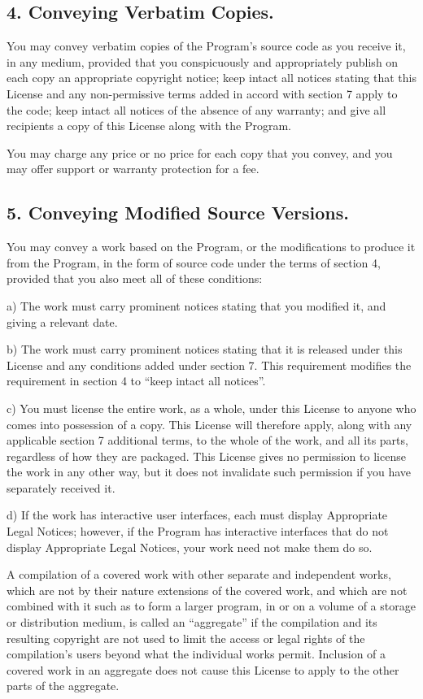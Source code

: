 \subsection{4. Conveying Verbatim Copies.}
You may convey verbatim copies of the Program's source code as you receive it, in any medium, provided that you conspicuously and appropriately publish on each copy an appropriate copyright notice; keep intact all notices stating that this License and any non-permissive terms added in accord with section 7 apply to the code; keep intact all notices of the absence of any warranty; and give all recipients a copy of this License along with the Program.\par
You may charge any price or no price for each copy that you convey, and you may offer support or warranty protection for a fee.
\subsection{5. Conveying Modified Source Versions.}
You may convey a work based on the Program, or the modifications to produce it from the Program, in the form of source code under the terms of section 4, provided that you also meet all of these conditions:\par
a) The work must carry prominent notices stating that you modified it, and giving a relevant date.\par
b) The work must carry prominent notices stating that it is released under this License and any conditions added under section 7. This requirement modifies the requirement in section 4 to “keep intact all notices”.\par
c) You must license the entire work, as a whole, under this License to anyone who comes into possession of a copy. This License will therefore apply, along with any applicable section 7 additional terms, to the whole of the work, and all its parts, regardless of how they are packaged. This License gives no permission to license the work in any other way, but it does not invalidate such permission if you have separately received it.\par
d) If the work has interactive user interfaces, each must display Appropriate Legal Notices; however, if the Program has interactive interfaces that do not display Appropriate Legal Notices, your work need not make them do so.\par
A compilation of a covered work with other separate and independent works, which are not by their nature extensions of the covered work, and which are not combined with it such as to form a larger program, in or on a volume of a storage or distribution medium, is called an “aggregate” if the compilation and its resulting copyright are not used to limit the access or legal rights of the compilation's users beyond what the individual works permit. Inclusion of a covered work in an aggregate does not cause this License to apply to the other parts of the aggregate.
